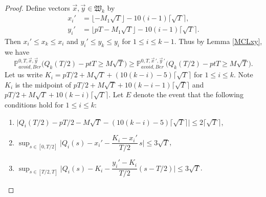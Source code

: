 \begin{proof}
	Define vectors $\vec{x},\vec{y}\in\mathfrak{W}_k$ by
	\begin{align*}
	x_i' &= \lfloor - M_1\sqrt{T} \rfloor - 10(i-1)\lceil\sqrt{T}\rceil,\\
	y_i' &= \lfloor pT - M_1\sqrt{T}\rfloor - 10(i-1)\lceil\sqrt{T}\rceil.
	\end{align*}
	Then $x_i'\leq x_k \leq x_i$ and $y_i' \leq y_k \leq y_i$ for $1\leq i\leq k-1$. Thus by Lemma \ref{MCLxy}, we have
	\begin{equation*}
	\mathbb{P}^{0,T,\vec{x},\vec{y}}_{avoid, Ber} \Big(Q_k(T/2) - ptT \geq M\sqrt{T}\Big) \geq \mathbb{P}^{0,T,\vec{x}\,',\vec{y}\,'}_{avoid, Ber} \Big(Q_k(T/2) - ptT \geq M\sqrt{T}\Big).
	\end{equation*}
	Let us write $K_i = pT/2 + M\sqrt{T}+(10(k-i)-5)\lceil\sqrt{T}\rceil$ for $1\leq i\leq k$. Note $K_i$ is the midpoint of $pT/2 + M\sqrt{T} + 10(k-i-1)\lceil\sqrt{T}\rceil$ and $pT/2 + M\sqrt{T}+10(k-i)\lceil\sqrt{T}\rceil$. Let $E$ denote the event that the following conditions hold for $1\leq i\leq k$:
	\begin{enumerate}[label=(\arabic*)]
		
		\item $\big| Q_i(T/2) - pT/2 - M\sqrt{T} - (10(k-i)-5)\lceil\sqrt{T}\rceil \big| \leq 2\lceil\sqrt{T}\rceil$,
		
		\item $\sup_{s\in[0,T/2]} \Big|Q_i(s)-x_i'-\dfrac{K_i-x_i'}{T/2}\,s\Big| \leq 3\sqrt{T}$,
		
		\item $\sup_{s\in[T/2,T]} \Big|Q_i(s)-K_i-\dfrac{y_i'-K_i}{T/2}(s-T/2)\Big| \leq 3\sqrt{T}$.
		

\end{enumerate}
\end{proof}
